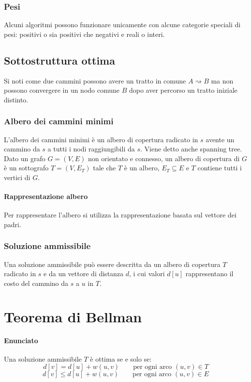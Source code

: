 	\subsubsection{Pesi}
	Alcuni algoritmi possono funzionare unicamente con alcune categorie speciali di pesi: positivi o
	sia positivi che negativi e reali o interi.
	\subsection{Sottostruttura ottima}
	Si noti come due cammini possono avere un tratto in comune $A\rightsquigarrow B$ ma non possono
	convergere in un nodo comune $B$ dopo aver percorso un tratto iniziale distinto.
	\subsubsection{Albero dei cammini minimi}
	L'albero dei cammini minimi \`e un albero di copertura radicato in $s$ avente un cammino da $s$ a
	tutti i nodi raggiungibili da $s$. Viene detto anche spanning tree. Dato un grafo $G= (V, E)$ non
	orientato e connesso, un albero di copertura di $G$ \`e un sottografo $T=(V, E_T)$ tale che $T$ \`e
	un albero, $E_T\subseteq E$ e $T$ contiene tutti i vertici di $G$.
	\paragraph{Rappresentazione albero} Per rappresentare l'albero si utilizza la rappresentazione basata
	sul vettore dei padri.
	\subsubsection{Soluzione ammissibile}
	Una soluzione ammissibile pu\`o essere descritta da un albero di copertura $T$ radicato in $s$ e da
	un vettore di distanza $d$, i cui valori $d[u]$ rappresentano il costo del cammino da $s$ a $u$ in
	$T$.\\ 
\section{Teorema di Bellman}
	\paragraph{Enunciato}
	Una soluzione ammissibile $T$ \`e ottima se e solo se: $$d[v] = d[u]+w(u, v) \quad\quad \text{per
			ogni arco }(u, v)\in T$$ $$d[v] \le d[u]+w(u, v) \quad\quad \text{per ogni arco }(u, v) \in E$$
